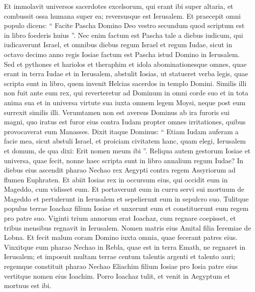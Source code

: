 \begin{biblechapter}
\begin{biblechapter}
\begin{biblechapter}
\begin{biblechapter}
\begin{biblechapter}
\begin{biblechapter}
\begin{biblechapter}
\begin{biblechapter}
\begin{biblechapter}
\begin{biblechapter}
\begin{biblechapter}
\begin{biblechapter}
\begin{biblechapter}
\begin{biblechapter}
\begin{biblechapter}
\begin{biblechapter}
\begin{biblechapter}
\begin{biblechapter}
\begin{biblechapter}
\begin{biblechapter}
\begin{biblechapter}
\begin{biblechapter}
\begin{biblechapter}
\verse Et immolavit universos sacerdotes excelsorum, qui erant ibi super altaria, et combussit ossa humana super ea; reversusque est Ierusalem.
 \verse Et praecepit omni populo dicens: “ Facite Pascha Domino Deo vestro secundum quod scriptum est in libro foederis huius ”. 
\verse Nec enim factum est Pascha tale a diebus iudicum, qui iudicaverunt Israel, et omnibus diebus regum Israel et regum Iudae, 
\verse sicut in octavo decimo anno regis Iosiae factum est Pascha istud Domino in Ierusalem.
 \verse Sed et pythones et hariolos et theraphim et idola abominationesque omnes, quae erant in terra Iudae et in Ierusalem, abstulit Iosias, ut statueret verba legis, quae scripta sunt in libro, quem invenit Helcias sacerdos in templo Domini. 
\verse Similis illi non fuit ante eum rex, qui reverteretur ad Dominum in omni corde suo et in tota anima sua et in universa virtute sua iuxta omnem legem Moysi, neque post eum surrexit similis illi.
 \verse Verumtamen non est aversus Dominus ab ira furoris sui magni, quo iratus est furor eius contra Iudam propter omnes irritationes, quibus provocaverat eum Manasses. 
\verse Dixit itaque Dominus: “ Etiam Iudam auferam a facie mea, sicut abstuli Israel, et proiciam civitatem hanc, quam elegi, Ierusalem et domum, de qua dixi: Erit nomen meum ibi ”.
 \verse Reliqua autem gestorum Iosiae et universa, quae fecit, nonne haec scripta sunt in libro annalium regum Iudae? 
\verse In diebus eius ascendit pharao Nechao rex Aegypti contra regem Assyriorum ad flumen Euphraten. Et abiit Iosias rex in occursum eius, qui occidit eum in Mageddo, cum vidisset eum. 
\verse Et portaverunt eum in curru servi sui mortuum de Mageddo et pertulerunt in Ierusalem et sepelierunt eum in sepulcro suo. Tulitque populus terrae Ioachaz filium Iosiae et unxerunt eum et constituerunt eum regem pro patre suo.
 \verse Viginti trium annorum erat Ioachaz, cum regnare coepisset, et tribus mensibus regnavit in Ierusalem. Nomen matris eius Amital filia Ieremiae de Lobna. 
\verse Et fecit malum coram Domino iuxta omnia, quae fecerant patres eius. 
\verse Vinxitque eum pharao Nechao in Rebla, quae est in terra Emath, ne regnaret in Ierusalem; et imposuit multam terrae centum talentis argenti et talento auri; 
 \verse regemque constituit pharao Nechao Eliachim filium Iosiae pro Iosia patre eius vertitque nomen eius Ioachim. Porro Ioachaz tulit, et venit in Aegyptum et mortuus est ibi. 

\end{biblechapter}
\end{biblechapter}
\end{biblechapter}
\end{biblechapter}
\end{biblechapter}
\end{biblechapter}
\end{biblechapter}
\end{biblechapter}
\end{biblechapter}
\end{biblechapter}
\end{biblechapter}
\end{biblechapter}
\end{biblechapter}
\end{biblechapter}
\end{biblechapter}
\end{biblechapter}
\end{biblechapter}
\end{biblechapter}
\end{biblechapter}
\end{biblechapter}
\end{biblechapter}
\end{biblechapter}
\end{biblechapter}
